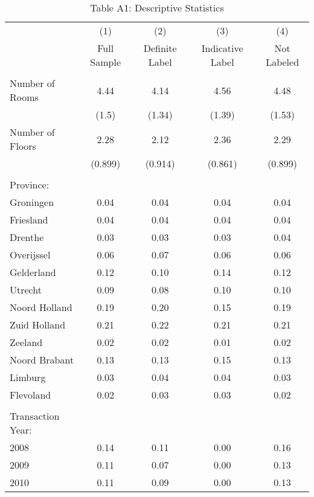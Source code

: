 \documentclass[12pt]{article}
\begin{document}
\begin{table}[H]
\scriptsize
  \centering
  \caption*{Table A1: Descriptive Statistics}
      \begin{tabular}{lcccc}
\hline
                &\multicolumn{1}{c}{(1)}&\multicolumn{1}{c}{(2)}&\multicolumn{1}{c}{(3)}&\multicolumn{1}{c}{(4)}\\
& Full Sample                      & Definite Label & Indicative Label & Not Labeled \\
\hline
&&&&\\
    Number of Rooms & 4.44  & 4.14  & 4.56  & 4.48 \\
          & (1.5) & (1.34) & (1.39) & (1.53) \\
    Number of Floors & 2.28  & 2.12  & 2.36  & 2.29 \\
          & (0.899) & (0.914) & (0.861) & (0.899) \\
          &       &       &       &  \\
    Province: &       &       &       &  \\
    Groningen & 0.04  & 0.04  & 0.04  & 0.04 \\
    Friesland & 0.04  & 0.04  & 0.04  & 0.04 \\
    Drenthe & 0.03  & 0.03  & 0.03  & 0.04 \\
    Overijssel & 0.06  & 0.07  & 0.06  & 0.06 \\
    Gelderland & 0.12  & 0.10  & 0.14  & 0.12 \\
    Utrecht & 0.09  & 0.08  & 0.10  & 0.10 \\
    Noord Holland & 0.19  & 0.20  & 0.15  & 0.19 \\
    Zuid Holland & 0.21  & 0.22  & 0.21  & 0.21 \\
    Zeeland & 0.02  & 0.02  & 0.01  & 0.02 \\
    Noord Brabant & 0.13  & 0.13  & 0.15  & 0.13 \\
    Limburg & 0.03  & 0.04  & 0.04  & 0.03 \\
    Flevoland & 0.02  & 0.03  & 0.03  & 0.02 \\
          &       &       &       &  \\
    Transaction Year: &       &       &       &  \\
    2008  & 0.14  & 0.11  & 0.00  & 0.16 \\
    2009  & 0.11  & 0.07  & 0.00  & 0.13 \\
    2010  & 0.11  & 0.09  & 0.00  & 0.13 \\

\end{tabular}
\end{table}
\end{document}
